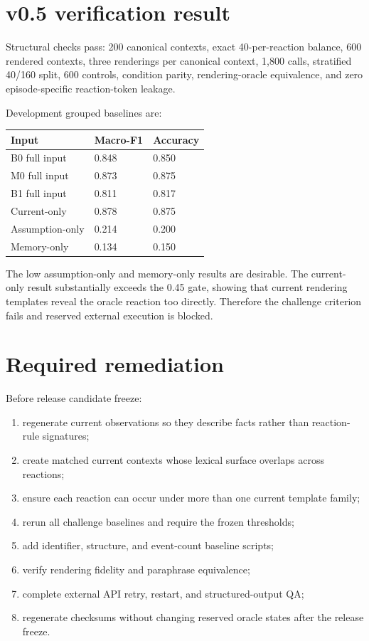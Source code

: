 \documentclass[10.5pt]{article}
\begin{document}
\section{v0.5 verification result}
Structural checks pass: 200 canonical contexts, exact 40-per-reaction balance, 600 rendered contexts, three renderings per canonical context, 1,800 calls, stratified 40/160 split, 600 controls, condition parity, rendering-oracle equivalence, and zero episode-specific reaction-token leakage.

Development grouped baselines are:
\begin{longtable}{p{}p{}p{}}
\toprule\textbf{Input}&\textbf{Macro-F1}&\textbf{Accuracy}\\\midrule
B0 full input & 0.848 & 0.850\\
M0 full input & 0.873 & 0.875\\
B1 full input & 0.811 & 0.817\\
Current-only & 0.878 & 0.875\\
Assumption-only & 0.214 & 0.200\\
Memory-only & 0.134 & 0.150\\
\bottomrule
\end{longtable}
The low assumption-only and memory-only results are desirable. The current-only result substantially exceeds the 0.45 gate, showing that current rendering templates reveal the oracle reaction too directly. Therefore the challenge criterion fails and reserved external execution is blocked.

\section{Required remediation}
Before release candidate freeze:
\begin{enumerate}
\item regenerate current observations so they describe facts rather than reaction-rule signatures;
\item create matched current contexts whose lexical surface overlaps across reactions;
\item ensure each reaction can occur under more than one current template family;
\item rerun all challenge baselines and require the frozen thresholds;
\item add identifier, structure, and event-count baseline scripts;
\item verify rendering fidelity and paraphrase equivalence;
\item complete external API retry, restart, and structured-output QA;
\item regenerate checksums without changing reserved oracle states after the release freeze.
\end{enumerate}
\end{document}
